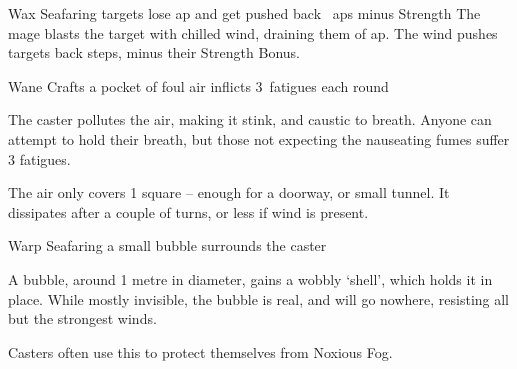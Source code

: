   {\mAir}%
  {Wax}%
  {}%
  {Seafaring}%
  {targets lose  \gls{ap} and get pushed back ~\glspl{ap} minus Strength}%
  {
    The mage blasts the target with chilled wind, draining them of  \gls{ap}.
    The wind pushes targets back  steps, minus their Strength Bonus.
  }

  {\mAir}%
  {Wane}%
  {}%
  {Crafts}%
  {a pocket of foul air inflicts 3~\glspl{fatigue} each round}%
  {
    The caster pollutes the air, making it stink, and caustic to breath.
    Anyone can attempt to hold their breath, but those not expecting the nauseating fumes suffer 3 \glspl{fatigue}.

    The air only covers 1 square -- enough for a doorway, or small tunnel.
    It dissipates after a couple of turns, or less if wind is present.
  }

  {\mAir}%
  {Warp}%
  {}%
  {Seafaring}%
  {a small bubble surrounds the caster}%
  {
    A bubble, around 1 metre in diameter, gains a wobbly `shell', which holds it in place.
    While mostly invisible, the bubble is real, and will go nowhere, resisting all but the strongest winds.

    Casters often use this to protect themselves from Noxious Fog.
  }

